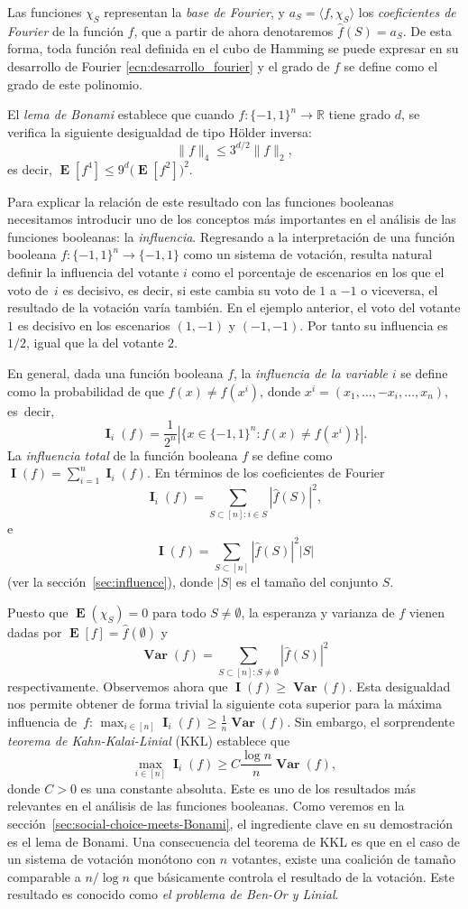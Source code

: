 \documentclass[autocontact]{gaceta}
\newcommand{\R}{\mathbb{R}}
\DeclareMathOperator{\Var}{\mathbf{Var}}
\DeclareMathOperator{\II}{\mathbf{I}}
\DeclareMathOperator{\EE}{\mathbf{E}}
\begin{document}
Las funciones $\chi_S$ representan la \emph{base de Fourier}, y $a_S=\langle f,\chi_S\rangle$ los \emph{coeficientes de Fourier} de la función $f$, que a partir de ahora denotaremos $\widehat{f}(S)=a_S$. De esta forma, toda función real definida en el cubo de Hamming se puede expresar en su desarrollo de Fourier \eqref{ecn:desarrollo_fourier} y el grado de $f$ se define como el grado de este polinomio.

El \emph{lema de Bonami} establece que cuando $f:\{-1,1\}^n\to\R$ tiene grado $d$, se verifica la siguiente desigualdad de tipo Hölder inversa:
\[
\|f\|_4\leq 3^{d/2}\|f\|_2,
\]
es decir, $\EE[f^4]\leq 9^d\big(\EE[f^2]\big)^2$.

Para explicar la relación de este resultado con las funciones booleanas necesitamos introducir uno de los conceptos más importantes en el análisis de las funciones booleanas: la \emph{influencia}.
Regresando a la interpretación de una función booleana
$f:\{-1,1\}^n\to\{-1,1\}$ como un sistema de votación, resulta natural definir la influencia del votante $i$ como el porcentaje de escenarios en los que el voto de~$i$ es decisivo, es decir, si este cambia su voto de $1$ a $-1$ o viceversa, el resultado de la votación varía también. En el ejemplo anterior, el voto del votante $1$ es decisivo en los escenarios $(1, -1)$ y $(-1, -1)$. Por tanto su influencia es $1/2$, igual que la del votante $2$.

En general, dada una función booleana $f$, la \emph{influencia de la variable} $i$ se define como la probabilidad de que $f(x)\neq f(x^i)$, donde $x^i=(x_1,\dots, -x_i,\dots, x_n)$, es~decir,
\[
\II_i(f) = \frac{1}{2^n}\left|\{x\in\{-1,1\}^n : f(x)\neq f(x^i)\}\right|.
\]
La \emph{influencia total} de la función booleana $f$ se define como $\II(f)=\sum_{i=1}^n \II_i(f)$. En términos de los coeficientes de Fourier
\[
   \II_i(f)= \sum_{S\subset [n] \colon i\in S} |\widehat{f}(S)|^2,
\]
e
\[
   \II(f)=\sum_{S\subset [n]} |\widehat{f}(S)|^2 |S|
\]
(ver la sección~\ref{sec:influence}), donde $|S|$ es el tamaño del conjunto $S$.

Puesto que $\EE(\chi_S)=0$ para todo $S\neq\emptyset$, la esperanza y varianza de $f$ vienen dadas por $\EE[f]= \widehat{f}(\emptyset)$ y
\[
   \Var(f)=\sum_{S\subset [n] \colon S\neq \emptyset} |\widehat{f}(S)|^2
\]
respectivamente. Observemos ahora que $\II(f)\geq \Var(f)$. Esta desigualdad nos permite obtener de forma trivial la siguiente cota superior para la máxima influencia de~$f$: $\max_{i\in [n]} \II_i(f) \geq \frac{1}{n} \Var(f)$. Sin embargo, el sorprendente \emph{teorema de Kahn-Kalai-Linial} (KKL) establece que
\[
\max_{i\in [n]} \II_i(f) \geq C \frac{\log n}{n} \Var(f),
\]
donde $C>0$ es una constante absoluta. Este es uno de los resultados más relevantes en el análisis de las funciones booleanas. Como veremos en la sección~\ref{sec:social-choice-meets-Bonami}, el ingrediente clave en su demostración es el lema de Bonami. Una consecuencia del teorema de KKL es que en el caso de un sistema de votación monótono con $n$ votantes, existe una coalición de tamaño comparable a $n/\log n$ que básicamente controla el resultado de la votación. Este resultado es conocido como \emph{el problema de Ben-Or y Linial}.
\end{document}

